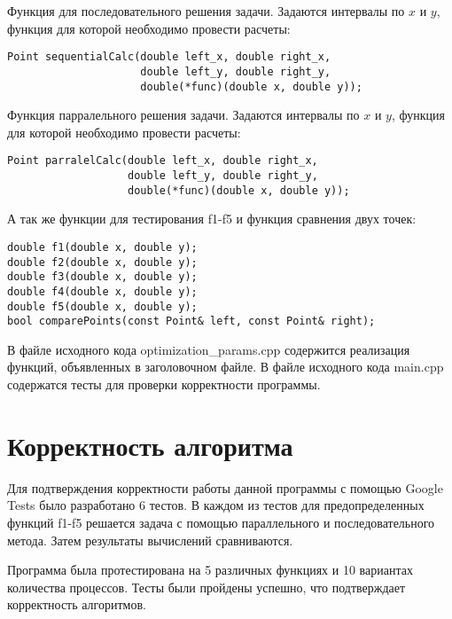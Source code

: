 \documentclass{report}
\begin{document}
\par Функция для последовательного решения задачи. Задаются интервалы по $x$ и $y$, функция для которой необходимо провести расчеты:
\begin{lstlisting}
Point sequentialCalc(double left_x, double right_x,
                     double left_y, double right_y,
                     double(*func)(double x, double y));
\end{lstlisting}

\par Функция парралельного решения задачи. Задаются интервалы по $x$ и $y$, функция для которой необходимо провести расчеты:
\begin{lstlisting}
Point parralelCalc(double left_x, double right_x,
                   double left_y, double right_y,
                   double(*func)(double x, double y));
\end{lstlisting}

\par А так же функции для тестирования f1-f5 и функция сравнения двух точек:
\begin{lstlisting}
double f1(double x, double y);
double f2(double x, double y);
double f3(double x, double y);
double f4(double x, double y);
double f5(double x, double y);
bool comparePoints(const Point& left, const Point& right);
\end{lstlisting}

\par В файле исходного кода optimization\_params.cpp содержится реализация функций,
объявленных в заголовочном файле. В файле исходного кода main.cpp содержатся тесты для
проверки корректности программы.


\newpage

\section*{Корректность алгоритма}
Для подтверждения корректности работы данной программы с помощью  Google Tests было разработано 6 тестов. В каждом из тестов для предопределенных функций f1-f5 решается задача с помощью параллельного и последовательного метода. Затем результаты вычислений сравниваются.
\par Программа была протестирована на 5 различных функциях и 10 вариантах количества процессов. Тесты были пройдены успешно, что подтверждает корректность алгоритмов.

\newpage
\end{document}
